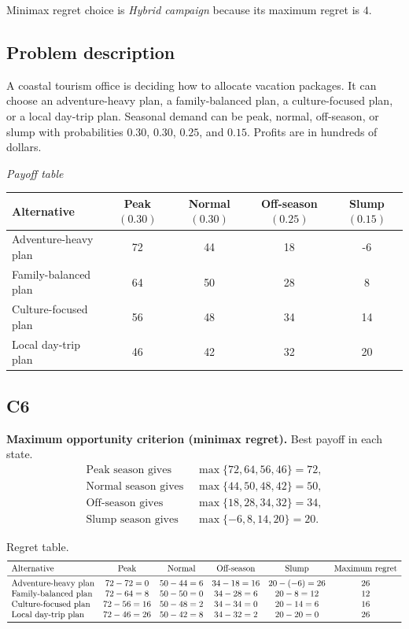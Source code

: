 \begin{ExamProblems}
		Minimax regret choice is \emph{Hybrid campaign} because its maximum regret is $4$.

		\item
		\subsection*{Problem description}
		A coastal tourism office is deciding how to allocate vacation packages. It can choose an adventure-heavy plan, a family-balanced plan, a culture-focused plan, or a local day-trip plan. Seasonal demand can be peak, normal, off-season, or slump with probabilities $0.30$, $0.30$, $0.25$, and $0.15$. Profits are in hundreds of dollars.

		\begin{center}
			\textit{Payoff table}\\
			\begin{tabular}{l c c c c}
				\toprule
				Alternative & Peak $(0.30)$ & Normal $(0.30)$ & Off-season $(0.25)$ & Slump $(0.15)$ \\
				\midrule
				Adventure-heavy plan & 72 & 44 & 18 & -6 \\
				Family-balanced plan & 64 & 50 & 28 & 8 \\
				Culture-focused plan & 56 & 48 & 34 & 14 \\
				Local day-trip plan & 46 & 42 & 32 & 20 \\
				\bottomrule
			\end{tabular}
		\end{center}

		\subsection*{C6}
		\textbf{Maximum opportunity criterion (minimax regret).} Best payoff in each state.
		\[
		\begin{aligned}
		\text{Peak season gives } &\max\{72,64,56,46\}=72,\\
		\text{Normal season gives } &\max\{44,50,48,42\}=50,\\
		\text{Off-season gives } &\max\{18,28,34,32\}=34,\\
		\text{Slump season gives } &\max\{-6,8,14,20\}=20.
		\end{aligned}
		\]

		Regret table.
		\[
		\begin{array}{lccccc}
			\toprule
			\text{Alternative} & \text{Peak} & \text{Normal} & \text{Off-season} & \text{Slump} & \text{Maximum regret}\\
			\midrule
			\text{Adventure-heavy plan} & 72-72=0 & 50-44=6 & 34-18=16 & 20-(-6)=26 & 26\\
			\text{Family-balanced plan} & 72-64=8 & 50-50=0 & 34-28=6 & 20-8=12 & 12\\
			\text{Culture-focused plan} & 72-56=16 & 50-48=2 & 34-34=0 & 20-14=6 & 16\\
			\text{Local day-trip plan} & 72-46=26 & 50-42=8 & 34-32=2 & 20-20=0 & 26\\
			\bottomrule
		\end{array}
		\]


\end{ExamProblems}
